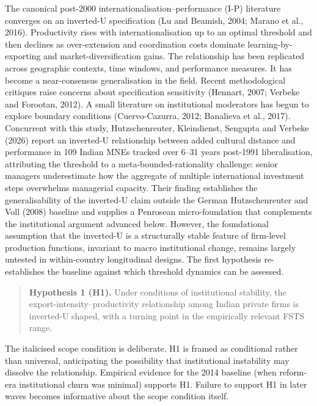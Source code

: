 \documentclass[
  12pt,a4paper]{article}
\begin{document}
The canonical post-2000 internationalisation--performance (I-P)
literature converges on an inverted-U specification (Lu and Beamish,
2004; Marano et al., 2016). Productivity rises with internationalisation
up to an optimal threshold and then declines as over-extension and
coordination costs dominate learning-by-exporting and
market-diversification gains. The relationship has been replicated
across geographic contexts, time windows, and performance measures. It
has become a near-consensus generalisation in the field. Recent
methodological critiques raise concerns about specification sensitivity
(Hennart, 2007; Verbeke and Forootan, 2012). A small literature on
institutional moderators has begun to explore boundary conditions
(Cuervo-Cazurra, 2012; Banalieva et al., 2017). Concurrent with this
study, Hutzschenreuter, Kleindienst, Sengupta and Verbeke (2026) report
an inverted-U relationship between added cultural distance and
performance in 109 Indian MNEs tracked over 6--31 years post-1991
liberalisation, attributing the threshold to a meta-bounded-rationality
challenge: senior managers underestimate how the aggregate of multiple
international investment steps overwhelms managerial capacity. Their
finding establishes the generalisability of the inverted-U claim outside
the German Hutzschenreuter and Voll (2008) baseline and supplies a
Penrosean micro-foundation that complements the institutional argument
advanced below. However, the foundational assumption that the inverted-U
is a structurally stable feature of firm-level production functions,
invariant to macro institutional change, remains largely untested in
within-country longitudinal designs. The first hypothesis re-establishes
the baseline against which threshold dynamics can be assessed.

\begin{quote}
\textbf{Hypothesis 1 (H1).} Under conditions of institutional stability,
the export-intensity--productivity relationship among Indian private
firms is inverted-U shaped, with a turning point in the empirically
relevant FSTS range.
\end{quote}

The italicised scope condition is deliberate. H1 is framed as
conditional rather than universal, anticipating the possibility that
institutional instability may dissolve the relationship. Empirical
evidence for the 2014 baseline (when reform-era institutional churn was
minimal) supports H1. Failure to support H1 in later waves becomes
informative about the scope condition itself.
\end{document}
